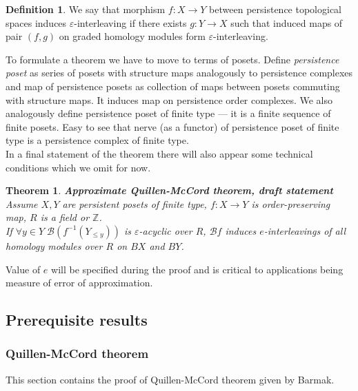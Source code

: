 \documentclass[a4paper, 12pt]{article}
\newtheorem{theorem}{Theorem}
\theoremstyle{definition}
\newtheorem{definition}{Definition}
\theoremstyle{remark}
\newcommand{\define}[1]{{\textit{#1}}}
\begin{document}
\begin{definition}
  We say that morphism $f : X \to Y$ between persistence topological spaces induces $\varepsilon$-interleaving if there exists $g : Y \to X$ such that induced maps of pair $(f,g)$ on graded homology modules form $\varepsilon$-interleaving.
\end{definition}

To formulate a theorem we have to move to terms of posets. Define \define{persistence poset} as series of posets with structure maps analogously to persistence complexes and map of persistence posets as collection of maps between posets commuting with structure maps. It induces map on persistence order complexes. We also analogously define persistence poset of finite type --- it is a finite sequence of finite posets. Easy to see that nerve (as a functor) of persistence poset of finite type is a persistence complex of finite type.\\

In a final statement of the theorem there will also appear some technical conditions which we omit for now.\\

\begin{theorem} \textbf{Approximate Quillen-McCord theorem, draft statement}\\
  Assume $X, Y$ are persistent posets of finite type, $f : X \to Y$ is order-preserving map, $R$ is a field or $\mathbb{Z}$.\\
  If $\forall y \in Y\;\mathcal{B}(f^{-1}(Y_{\leqslant y}))$ is $\varepsilon$-acyclic over $R$, $\mathcal{B}f$ induces $e$-interleavings of all homology modules over $R$ on $BX$ and $BY$.\\
\end{theorem}

Value of $e$ will be specified during the proof and is critical to applications being measure of error of approximation.

\subsection{Prerequisite results}

\subsubsection{Quillen-McCord theorem}

This section contains the proof of Quillen-McCord theorem given by Barmak.
\end{document}
